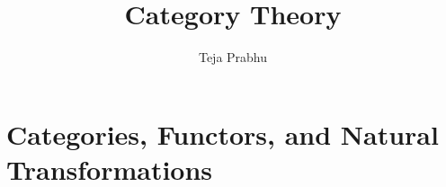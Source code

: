 \documentclass[11pt]{article}
\title{\textbf{Category Theory}}
\author{Teja Prabhu}
\date{}
\begin{document}
\maketitle
\newpage
\tableofcontents
\newpage

\section{Categories, Functors, and Natural Transformations}




\end{document}
